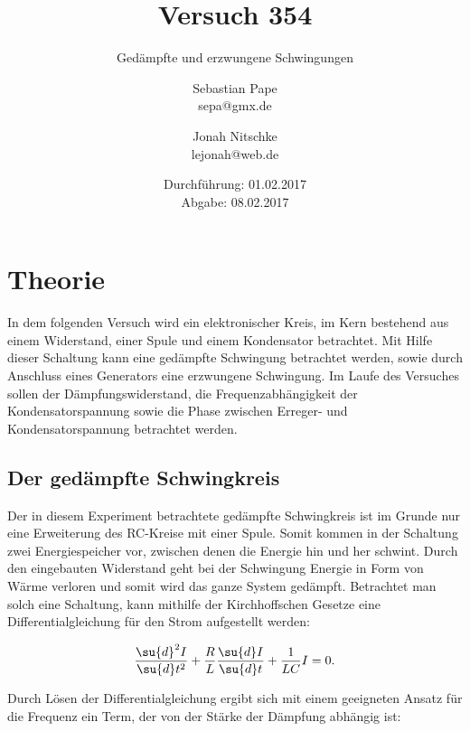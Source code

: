 

\title{Versuch 354}
\subtitle{Gedämpfte und erzwungene Schwingungen}
\author{Sebastian Pape\\
        sepa@gmx.de \and
        Jonah Nitschke\\
        lejonah@web.de}
\date{Durchführung: 01.02.2017\\
      Abgabe: 08.02.2017}



\maketitle
\newpage

\section{Theorie}

In dem folgenden Versuch wird ein elektronischer Kreis, im Kern bestehend aus einem
Widerstand, einer Spule und einem Kondensator betrachtet. Mit Hilfe dieser Schaltung kann eine
gedämpfte Schwingung betrachtet werden, sowie durch Anschluss eines Generators
eine erzwungene Schwingung. Im Laufe des Versuches sollen der Dämpfungswiderstand,
die Frequenzabhängigkeit der Kondensatorspannung sowie die Phase zwischen
Erreger- und Kondensatorspannung betrachtet werden.

\subsection{Der gedämpfte Schwingkreis}

Der in diesem Experiment betrachtete gedämpfte Schwingkreis ist im Grunde nur
eine Erweiterung des RC-Kreise mit einer Spule. Somit kommen in der Schaltung
zwei Energiespeicher vor, zwischen denen die Energie hin und her schwint. Durch
den eingebauten Widerstand geht bei der Schwingung Energie in Form von Wärme verloren
und somit wird das ganze System gedämpft. Betrachtet man solch eine Schaltung, kann
mithilfe der Kirchhoffschen Gesetze eine Differentialgleichung für den Strom
aufgestellt werden:

\begin{equation}
  \frac{\su{d}^2I}{\su{d}t^2} + \frac{R}{L}\frac{\su{d}I}{\su{d}t} + \frac{1}{LC} I = 0 .
\end{equation}

Durch Lösen der Differentialgleichung ergibt sich mit einem geeigneten Ansatz für
die Frequenz ein Term, der von der Stärke der Dämpfung abhängig ist:

